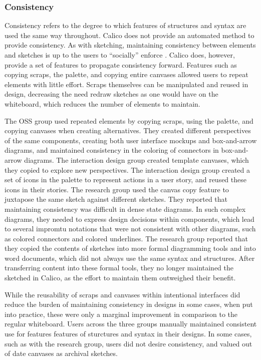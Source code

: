\subsubsection{Consistency}
Consistency refers to the degree to which features of structures and syntax are used the same way throughout. Calico does not provide an automated method to provide consistency. As with sketching, maintaining consistency between elements and sketches is up to the users to ``socially'' enforce \cite{Petre2013BookChapter}. Calico does, however, provide a set of features to propagate consistency forward. Features such as copying scraps, the palette, and copying entire canvases allowed users to repeat elements with little effort. Scraps themselves can be manipulated and reused in design, decreasing the need redraw sketches as one would have on the whiteboard, which reduces the number of elements to maintain.

The OSS group used repeated elements by copying scraps, using the palette, and copying canvases when creating alternatives. They created different perspectives of the same components, creating both user interface mockups and box-and-arrow diagrams, and maintained consistency in the coloring of connectors in box-and-arrow diagrams. The interaction design group created template canvases, which they copied to explore new perspectives. The interaction design group created a set of icons in the palette to represent actions in a user story, and reused these icons in their stories. The research group used the canvas copy feature to juxtapose the same sketch against different sketches. They reported that maintaining consistency was difficult in dense state diagrams. In such complex diagrams, they needed to express design decisions within components, which lead to several impromtu notations that were not consistent with other diagrams, such as colored connectors and colored underlines. The research group reported that they copied the contents of sketches into more formal diagramming tools and into word documents, which did not always use the same syntax and structures. After transferring content into these formal tools, they no longer maintained the sketched in Calico, as the effort to maintain them outweighed their benefit.

While the reusability of scraps and canvases within intentional interfaces did reduce the burden of maintaining consistency in designs in some cases, when put into practice, these were only a marginal improvement in comparison to the regular whiteboard. Users across the three groups manually maintained consistent use for features features of sturctures and syntax in their designs. In some cases, such as with the research group, users did not desire consistency, and valued out of date canvases as archival sketches.

